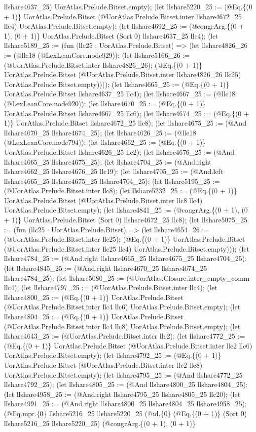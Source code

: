 \documentclass[11pt]{article}
\begin{document}
llshare4637\_25) UorAtlas.Prelude.Bitset.empty); (let llshare5220\_25 := (@Eq.\{(0 + 1)\} UorAtlas.Prelude.Bitset (@UorAtlas.Prelude.Bitset.inter llshare4672\_25 llc4) UorAtlas.Prelude.Bitset.empty); (let llshare4692\_25 := (@congrArg.\{(0 + 1), (0 + 1)\} UorAtlas.Prelude.Bitset (Sort 0) llshare4637\_25 llc4); (let llshare5189\_25 := (fun (llc25 : UorAtlas.Prelude.Bitset) => (let llshare4826\_26 := (@llc18 (@LexLeanCore.node929)); (let llshare5166\_26 := (@UorAtlas.Prelude.Bitset.inter llshare4826\_26); (@Eq.\{(0 + 1)\} UorAtlas.Prelude.Bitset (@UorAtlas.Prelude.Bitset.inter llshare4826\_26 llc25) UorAtlas.Prelude.Bitset.empty)))); (let llshare4665\_25 := (@Eq.\{(0 + 1)\} UorAtlas.Prelude.Bitset llshare4637\_25 llc4); (let llshare4667\_25 := (@llc18 (@LexLeanCore.node920)); (let llshare4670\_25 := (@Eq.\{(0 + 1)\} UorAtlas.Prelude.Bitset llshare4667\_25 llc6); (let llshare4674\_25 := (@Eq.\{(0 + 1)\} UorAtlas.Prelude.Bitset llshare4672\_25 llc8); (let llshare4675\_25 := (@And llshare4670\_25 llshare4674\_25); (let llshare4626\_25 := (@llc18 (@LexLeanCore.node794)); (let llshare4662\_25 := (@Eq.\{(0 + 1)\} UorAtlas.Prelude.Bitset llshare4626\_25 llc2); (let llshare4676\_25 := (@And llshare4665\_25 llshare4675\_25); (let llshare4704\_25 := (@And.right llshare4662\_25 llshare4676\_25 llc19); (let llshare4705\_25 := (@And.left llshare4665\_25 llshare4675\_25 llshare4704\_25); (let llshare5195\_25 := (@UorAtlas.Prelude.Bitset.inter llc8); (let llshare5232\_25 := (@Eq.\{(0 + 1)\} UorAtlas.Prelude.Bitset (@UorAtlas.Prelude.Bitset.inter llc8 llc4) UorAtlas.Prelude.Bitset.empty); (let llshare4841\_25 := (@congrArg.\{(0 + 1), (0 + 1)\} UorAtlas.Prelude.Bitset (Sort 0) llshare4672\_25 llc8); (let llshare5075\_25 := (fun (llc25 : UorAtlas.Prelude.Bitset) => (let llshare4654\_26 := (@UorAtlas.Prelude.Bitset.inter llc25); (@Eq.\{(0 + 1)\} UorAtlas.Prelude.Bitset (@UorAtlas.Prelude.Bitset.inter llc25 llc4) UorAtlas.Prelude.Bitset.empty))); (let llshare4784\_25 := (@And.right llshare4665\_25 llshare4675\_25 llshare4704\_25); (let llshare4845\_25 := (@And.right llshare4670\_25 llshare4674\_25 llshare4784\_25); (let llshare5080\_25 := (@UorAtlas.Closure.inter\_empty\_comm llc4); (let llshare4797\_25 := (@UorAtlas.Prelude.Bitset.inter llc4); (let llshare4800\_25 := (@Eq.\{(0 + 1)\} UorAtlas.Prelude.Bitset (@UorAtlas.Prelude.Bitset.inter llc4 llc6) UorAtlas.Prelude.Bitset.empty); (let llshare4804\_25 := (@Eq.\{(0 + 1)\} UorAtlas.Prelude.Bitset (@UorAtlas.Prelude.Bitset.inter llc4 llc8) UorAtlas.Prelude.Bitset.empty); (let llshare4643\_25 := (@UorAtlas.Prelude.Bitset.inter llc2); (let llshare4772\_25 := (@Eq.\{(0 + 1)\} UorAtlas.Prelude.Bitset (@UorAtlas.Prelude.Bitset.inter llc2 llc6) UorAtlas.Prelude.Bitset.empty); (let llshare4792\_25 := (@Eq.\{(0 + 1)\} UorAtlas.Prelude.Bitset (@UorAtlas.Prelude.Bitset.inter llc2 llc8) UorAtlas.Prelude.Bitset.empty); (let llshare4795\_25 := (@And llshare4772\_25 llshare4792\_25); (let llshare4805\_25 := (@And llshare4800\_25 llshare4804\_25); (let llshare4958\_25 := (@And.right llshare4795\_25 llshare4805\_25 llc20); (let llshare4991\_25 := (@And.right llshare4800\_25 llshare4804\_25 llshare4958\_25); (@Eq.mpr.\{0\} llshare5216\_25 llshare5220\_25 (@id.\{0\} (@Eq.\{(0 + 1)\} (Sort 0) llshare5216\_25 llshare5220\_25) (@congrArg.\{(0 + 1), (0 + 1)\} 
\end{document}

